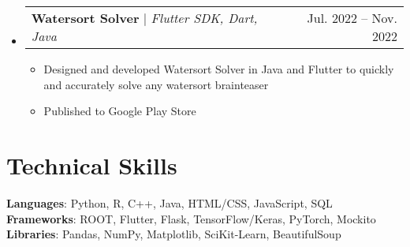 \documentclass[letterpaper,11pt]{article}
\makeatletter
\newcommand{\resumeItem}[1]{
  \item\small{
    {#1 \vspace{-2pt}}
  }
}
\newcommand{\resumeProjectHeading}[2]{
    \item
    \begin{tabular*}{0.97\textwidth}{l@{\extracolsep{\fill}}r}
      \small#1 & #2 \\
    \end{tabular*}\vspace{-7pt}
}
\newcommand{\resumeSubHeadingListStart}{\begin{itemize}[leftmargin=0.15in, label={}]}
\newcommand{\resumeSubHeadingListEnd}{\end{itemize}}
\newcommand{\resumeItemListStart}{\begin{itemize}}
\newcommand{\resumeItemListEnd}{\end{itemize}\vspace{-5pt}}
\makeatother
\begin{document}
  \resumeSubHeadingListStart
    \resumeProjectHeading
      {\textbf{Watersort Solver} $|$ \emph{Flutter SDK, Dart, Java}}{Jul. 2022 -- Nov. 2022}
      \resumeItemListStart
        \resumeItem{Designed and developed Watersort Solver in Java and Flutter to quickly and accurately solve any watersort brainteaser}
        \resumeItem{Published to Google Play Store}
      \resumeItemListEnd
  \resumeSubHeadingListEnd

\section{Technical Skills}
   \begin{itemize}[leftmargin=0.15in, label={}] 
    \small{\item{
      \textbf{Languages}: Python, R, C++, Java, HTML/CSS, JavaScript, SQL\\
      \textbf{Frameworks}: ROOT, Flutter, Flask, TensorFlow/Keras, PyTorch, Mockito\\
      \textbf{Libraries}: Pandas, NumPy, Matplotlib, SciKit-Learn, BeautifulSoup
       }}
\end{itemize}
\end{document}
